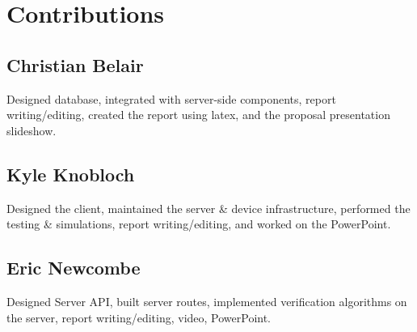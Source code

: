 \section{Contributions}

\subsection{Christian Belair}
Designed database, integrated with server-side components, report writing/editing, created the report using latex, and the proposal presentation slideshow.

\subsection{Kyle Knobloch}
Designed the client, maintained the server \& device infrastructure, performed the testing \& simulations, report writing/editing, and worked on the PowerPoint. 

\subsection{Eric Newcombe}
Designed Server API, built server routes, implemented verification algorithms on the server, report writing/editing, video, PowerPoint.